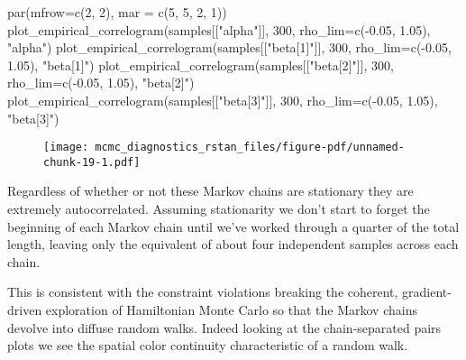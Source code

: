 \documentclass[
  letterpaper,
  DIV=11,
  numbers=noendperiod]{scrartcl}
\newenvironment{Shaded}{\begin{snugshade}}{\end{snugshade}}
\newcommand{\AttributeTok}[1]{\textcolor[rgb]{0.40,0.45,0.13}{#1}}
\newcommand{\DecValTok}[1]{\textcolor[rgb]{0.68,0.00,0.00}{#1}}
\newcommand{\FloatTok}[1]{\textcolor[rgb]{0.68,0.00,0.00}{#1}}
\newcommand{\FunctionTok}[1]{\textcolor[rgb]{0.28,0.35,0.67}{#1}}
\newcommand{\NormalTok}[1]{\textcolor[rgb]{0.00,0.23,0.31}{#1}}
\newcommand{\SpecialCharTok}[1]{\textcolor[rgb]{0.37,0.37,0.37}{#1}}
\newcommand{\StringTok}[1]{\textcolor[rgb]{0.13,0.47,0.30}{#1}}
\begin{document}
\begin{Shaded}
\begin{Highlighting}[]
\FunctionTok{par}\NormalTok{(}\AttributeTok{mfrow=}\FunctionTok{c}\NormalTok{(}\DecValTok{2}\NormalTok{, }\DecValTok{2}\NormalTok{), }\AttributeTok{mar =} \FunctionTok{c}\NormalTok{(}\DecValTok{5}\NormalTok{, }\DecValTok{5}\NormalTok{, }\DecValTok{2}\NormalTok{, }\DecValTok{1}\NormalTok{))}
\FunctionTok{plot\_empirical\_correlogram}\NormalTok{(samples[[}\StringTok{"alpha"}\NormalTok{]], }\DecValTok{300}\NormalTok{,}
                           \AttributeTok{rho\_lim=}\FunctionTok{c}\NormalTok{(}\SpecialCharTok{{-}}\FloatTok{0.05}\NormalTok{, }\FloatTok{1.05}\NormalTok{), }\StringTok{"alpha"}\NormalTok{)}
\FunctionTok{plot\_empirical\_correlogram}\NormalTok{(samples[[}\StringTok{"beta[1]"}\NormalTok{]], }\DecValTok{300}\NormalTok{,}
                           \AttributeTok{rho\_lim=}\FunctionTok{c}\NormalTok{(}\SpecialCharTok{{-}}\FloatTok{0.05}\NormalTok{, }\FloatTok{1.05}\NormalTok{), }\StringTok{"beta[1]"}\NormalTok{)}
\FunctionTok{plot\_empirical\_correlogram}\NormalTok{(samples[[}\StringTok{"beta[2]"}\NormalTok{]], }\DecValTok{300}\NormalTok{,}
                           \AttributeTok{rho\_lim=}\FunctionTok{c}\NormalTok{(}\SpecialCharTok{{-}}\FloatTok{0.05}\NormalTok{, }\FloatTok{1.05}\NormalTok{), }\StringTok{"beta[2]"}\NormalTok{)}
\FunctionTok{plot\_empirical\_correlogram}\NormalTok{(samples[[}\StringTok{"beta[3]"}\NormalTok{]], }\DecValTok{300}\NormalTok{,}
                           \AttributeTok{rho\_lim=}\FunctionTok{c}\NormalTok{(}\SpecialCharTok{{-}}\FloatTok{0.05}\NormalTok{, }\FloatTok{1.05}\NormalTok{), }\StringTok{"beta[3]"}\NormalTok{)}
\end{Highlighting}
\end{Shaded}

\begin{figure}[H]

{\centering \texttt{[image: mcmc\_diagnostics\_rstan\_files/figure-pdf/unnamed-chunk-19-1.pdf]}

}

\end{figure}

Regardless of whether or not these Markov chains are stationary they are
extremely autocorrelated. Assuming stationarity we don't start to forget
the beginning of each Markov chain until we've worked through a quarter
of the total length, leaving only the equivalent of about four
independent samples across each chain.

This is consistent with the constraint violations breaking the coherent,
gradient-driven exploration of Hamiltonian Monte Carlo so that the
Markov chains devolve into diffuse random walks. Indeed looking at the
chain-separated pairs plots we see the spatial color continuity
characteristic of a random walk.
\end{document}
